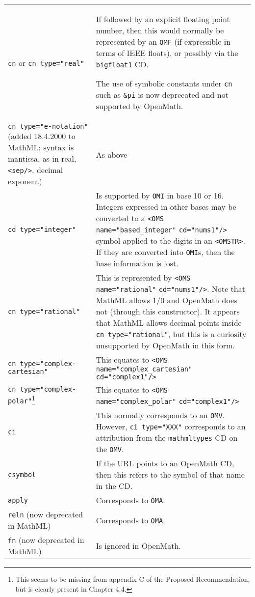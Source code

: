 \documentclass[twoside,11pt]{article}
\begin{document}
\begin{longtable}{
        >{\raggedright\let\\=\tabularnewline}p{2in}
        >{\raggedright\let\\=\tabularnewline}p{3in}}
\verb+cn+ or \verb+cn type="real"+&If followed by an explicit floating
point number, then this would normally be represented by an \verb+OMF+
(if expressible in terms of IEEE floats), or possibly via the
\verb+bigfloat1+ CD.\par\noindent
The use of symbolic constants under \verb+cn+ such as \verb+&pi+ is
now deprecated and not supported by OpenMath.\\
\verb+cn type="e-notation"+ (added 18.4.2000 to MathML: syntax is
mantissa, as in real, \verb+<sep/>+, decimal exponent)&As above\\
\verb+cd type="integer"+&Is supported by \verb+OMI+ in base 10 or 16.
Integers expressed in other bases may be converted to a
\verb+<OMS name="based_integer"+ \verb+cd="nums1"/>+ symbol
applied to the digits in an \verb+<OMSTR>+. If they are converted into 
\verb+OMI+s, then the base information is lost.\\
\verb+cn type="rational"+&This is represented by 
\verb+<OMS name="rational"+ \verb+cd="nums1"/>+. Note that MathML allows 1/0 and OpenMath
does not (through this constructor). It appears that MathML allows
decimal points inside \verb+cn type="rational"+, but this is a
curiosity unsupported by OpenMath in this form.\\
\verb+cn type="complex-cartesian"+&This equates to 
\verb+<OMS name="complex_cartesian"+ \verb+cd="complex1"/>+\\
\verb+cn type="complex-polar"+\footnote{This seems to be missing from
appendix C of the Proposed Recommendation, but is clearly present in
Chapter 4.4.}&This equates to 
\verb+<OMS name="complex_polar"+ \verb+cd="complex1"/>+\\
\verb+ci+&This normally corresponds to an \verb+OMV+. However,
\verb+ci type="XXX"+ corresponds to an attribution from
the \verb+mathmltypes+ CD on the \verb+OMV+.\\
\verb+csymbol+&If the URL points to an OpenMath CD, then this refers
to the symbol of that name in the CD.\\
\verb+apply+&Corresponds to \verb+OMA+.\\
\verb+reln+ (now deprecated in MathML)&Corresponds to \verb+OMA+.\\
\verb+fn+ (now deprecated in MathML)&Is ignored in OpenMath.\\

\end{longtable}
\end{document}

